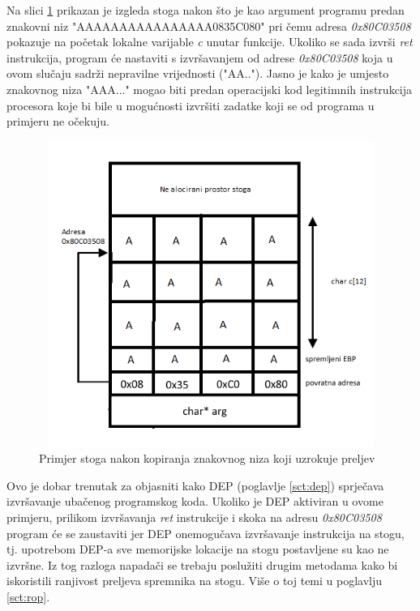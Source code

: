 \documentclass[times, utf8, diplomski, numeric]{fer}
\begin{document}
Na slici \ref{fig:buff_overflow_overflow} prikazan je izgleda
stoga nakon što je kao argument programu predan znakovni niz
"AAAAAAAAAAAAAAAA0835C080" pri čemu adresa \emph{0x80C03508}				%
pokazuje na početak lokalne varijable \emph{c} unutar funkcije.
Ukoliko se sada izvrši \emph{ret} instrukcija, program će
nastaviti s izvršavanjem od adrese \emph{0x80C03508} koja u ovom
slučaju sadrži nepravilne vrijednosti ("AA.."). Jasno je kako je
umjesto znakovnog niza "AAA..." mogao biti predan operacijski kod
legitimnih instrukcija procesora koje bi bile u mogućnosti
izvršiti zadatke koji se od programa u primjeru ne očekuju.

\begin{figure}[!ht]
\centering
\setlength\fboxsep{0pt}
\setlength\fboxrule{0.5pt}
\includegraphics[width=12cm, height=10cm]{slike/buffer_overflow_overflow}
\caption{Primjer stoga nakon kopiranja znakovnog niza koji uzrokuje preljev}
\label{fig:buff_overflow_overflow} 
\end{figure}

Ovo je dobar trenutak za objasniti kako DEP (poglavlje \ref{sct:dep})
sprječava izvršavanje ubačenog programskog koda. Ukoliko je DEP				%
aktiviran u ovome primjeru, prilikom izvršavanja \emph{ret}
instrukcije i skoka na adresu \emph{0x80C03508} program će se
zaustaviti jer DEP onemogučava izvršavanje instrukcija na stogu,
tj. upotrebom DEP-a sve memorijske lokacije na stogu postavljene
su kao ne izvršne. Iz tog razloga napadači se trebaju poslužiti
drugim metodama kako bi iskoristili ranjivost preljeva spremnika
na stogu. Više o toj temi u poglavlju \ref{sct:rop}.
\end{document}
